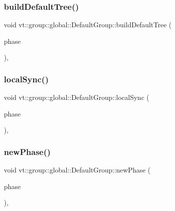 \subsubsection{\texorpdfstring{build\+Default\+Tree()}{buildDefaultTree()}}
{\footnotesize\ttfamily void vt\+::group\+::global\+::\+Default\+Group\+::build\+Default\+Tree (\begin{DoxyParamCaption}\item[{\hyperlink{namespacevt_1_1group_1_1global_a1ad2576a1029e469969bdcd577122ee3}{Phase\+Type} const \&}]{phase }\end{DoxyParamCaption})\hspace{0.3cm}{\ttfamily [static]}, {\ttfamily [private]}}

\mbox{\label{structvt_1_1group_1_1global_1_1_default_group_a4f79d96f09b2f8a2ed4c1139319aa5de}} 
\subsubsection{\texorpdfstring{local\+Sync()}{localSync()}}
{\footnotesize\ttfamily void vt\+::group\+::global\+::\+Default\+Group\+::local\+Sync (\begin{DoxyParamCaption}\item[{\hyperlink{namespacevt_1_1group_1_1global_a1ad2576a1029e469969bdcd577122ee3}{Phase\+Type} const \&}]{phase }\end{DoxyParamCaption})\hspace{0.3cm}{\ttfamily [static]}, {\ttfamily [private]}}

\mbox{\label{structvt_1_1group_1_1global_1_1_default_group_ae37dc75ff9eec3871d0734ac122ecd47}} 
\subsubsection{\texorpdfstring{new\+Phase()}{newPhase()}}
{\footnotesize\ttfamily void vt\+::group\+::global\+::\+Default\+Group\+::new\+Phase (\begin{DoxyParamCaption}\item[{\hyperlink{namespacevt_1_1group_1_1global_a1ad2576a1029e469969bdcd577122ee3}{Phase\+Type} const \&}]{phase }\end{DoxyParamCaption})\hspace{0.3cm}{\ttfamily [static]}, {\ttfamily [private]}}

